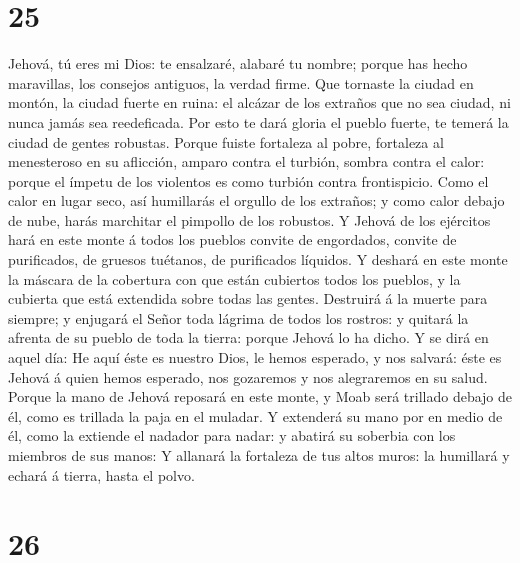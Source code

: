 \hypertarget{section-24}{%
\section{25}\label{section-24}}

 Jehová, tú eres mi Dios: te ensalzaré, alabaré tu nombre;
porque has hecho maravillas, los consejos antiguos, la verdad firme.
 Que tornaste la ciudad en montón, la ciudad fuerte en
ruina: el alcázar de los extraños que no sea ciudad, ni nunca jamás sea
reedeficada.  Por esto te dará gloria el pueblo fuerte, te
temerá la ciudad de gentes robustas.  Porque fuiste
fortaleza al pobre, fortaleza al menesteroso en su aflicción, amparo
contra el turbión, sombra contra el calor: porque el ímpetu de los
violentos es como turbión contra frontispicio.  Como el
calor en lugar seco, así humillarás el orgullo de los extraños; y como
calor debajo de nube, harás marchitar el pimpollo de los robustos.
 Y Jehová de los ejércitos hará en este monte á todos los
pueblos convite de engordados, convite de purificados, de gruesos
tuétanos, de purificados líquidos.  Y deshará en este
monte la máscara de la cobertura con que están cubiertos todos los
pueblos, y la cubierta que está extendida sobre todas las gentes.
 Destruirá á la muerte para siempre; y enjugará el Señor
toda lágrima de todos los rostros: y quitará la afrenta de su pueblo de
toda la tierra: porque Jehová lo ha dicho.  Y se dirá en
aquel día: He aquí éste es nuestro Dios, le hemos esperado, y nos
salvará: éste es Jehová á quien hemos esperado, nos gozaremos y nos
alegraremos en su salud.  Porque la mano de Jehová
reposará en este monte, y Moab será trillado debajo de él, como es
trillada la paja en el muladar.  Y extenderá su mano por
en medio de él, como la extiende el nadador para nadar: y abatirá su
soberbia con los miembros de sus manos:  Y allanará la
fortaleza de tus altos muros: la humillará y echará á tierra, hasta el
polvo.

\hypertarget{section-25}{%
\section{26}\label{section-25}}

